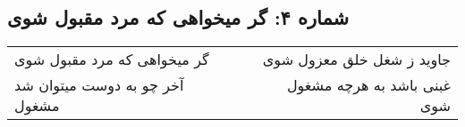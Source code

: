 \begin{center}
\section*{شماره ۴: گر میخواهی که مرد مقبول شوی}
\label{sec:004}
\begin{longtable}{l p{0.5cm} r}
گر میخواهی که مرد مقبول شوی
&&
جاوید ز شغل خلق معزول شوی
\\
آخر چو به دوست میتوان شد مشغول
&&
غبنی باشد به هرچه مشغول شوی
\\
\end{longtable}
\end{center}
